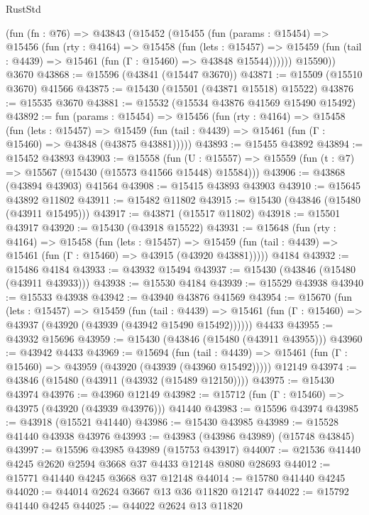 \begin{lexlean}{RustStd}
\begin{coremodule}
{\begin{coremodule}
{{{{{{{{{{{{{{{{{{{{{{{{{{{{{{{{{{{{{{{{{{{{{{{{{{{{{{{{{{{{    (fun (fn : @76) =>
    @43843
      (@15452
        (@15455
          (fun (params : @15454) =>
          @15456
            (fun (rty : @4164) =>
            @15458
              (fun (lets : @15457) =>
              @15459 (fun (tail : @4439) => @15461 (fun (Γ : @15460) => @43848 @15544))))))
        @15590))
    @3670
@43868 := @15596 (@43841 (@15447 @3670))
@43871 := @15509 (@15510 @3670) @41566
@43875 := @15430 (@15501 (@43871 @15518) @15522)
@43876 := @15535 @3670
@43881 := @15532 (@15534 @43876 @41569 @15490 @15492)
@43892 := fun (params : @15454) =>
  @15456
    (fun (rty : @4164) =>
    @15458
      (fun (lets : @15457) =>
      @15459 (fun (tail : @4439) => @15461 (fun (Γ : @15460) => @43848 (@43875 @43881)))))
@43893 := @15455 @43892
@43894 := @15452 @43893
@43903 := @15558
    (fun (U : @15557) => @15559 (fun (t : @7) => @15567 (@15430 (@15573 @41566 @15448) @15584)))
@43906 := @43868 (@43894 @43903) @41564
@43908 := @15415 @43893 @43903
@43910 := @15645 @43892 @11802
@43911 := @15482 @11802
@43915 := @15430 (@43846 (@15480 (@43911 @15495)))
@43917 := @43871 (@15517 @11802)
@43918 := @15501 @43917
@43920 := @15430 (@43918 @15522)
@43931 := @15648
    (fun (rty : @4164) =>
    @15458
      (fun (lets : @15457) =>
      @15459 (fun (tail : @4439) => @15461 (fun (Γ : @15460) => @43915 (@43920 @43881)))))
    @4184
@43932 := @15486 @4184
@43933 := @43932 @15494
@43937 := @15430 (@43846 (@15480 (@43911 @43933)))
@43938 := @15530 @4184
@43939 := @15529 @43938
@43940 := @15533 @43938
@43942 := @43940 @43876 @41569
@43954 := @15670
    (fun (lets : @15457) =>
    @15459
      (fun (tail : @4439) =>
      @15461 (fun (Γ : @15460) => @43937 (@43920 (@43939 (@43942 @15490 @15492))))))
    @4433
@43955 := @43932 @15696
@43959 := @15430 (@43846 (@15480 (@43911 @43955)))
@43960 := @43942 @4433
@43969 := @15694
    (fun (tail : @4439) => @15461 (fun (Γ : @15460) => @43959 (@43920 (@43939 (@43960 @15492)))))
    @12149
@43974 := @43846 (@15480 (@43911 (@43932 (@15489 @12150))))
@43975 := @15430 @43974
@43976 := @43960 @12149
@43982 := @15712 (fun (Γ : @15460) => @43975 (@43920 (@43939 @43976))) @41440
@43983 := @15596 @43974
@43985 := @43918 (@15521 @41440)
@43986 := @15430 @43985
@43989 := @15528 @41440 @43938 @43976
@43993 := @43983 (@43986 @43989) (@15748 @43845)
@43997 := @15596 @43985 @43989 (@15753 @43917)
@44007 := @21536 @41440 @4245 @2620 @2594 @3668 @37 @4433 @12148 @8080 @28693
@44012 := @15771 @41440 @4245 @3668 @37 @12148
@44014 := @15780 @41440 @4245
@44020 := @44014 @2624 @3667 @13 @36 @11820 @12147
@44022 := @15792 @41440 @4245
@44025 := @44022 @2624 @13 @11820
}}}}}}}}}}}}}}}}}}}}}}}}}}}}}}}}}}}}}}}}}}}}}}}}}}}}}}}}}}}}
\end{coremodule}}
\end{coremodule}
\end{lexlean}
